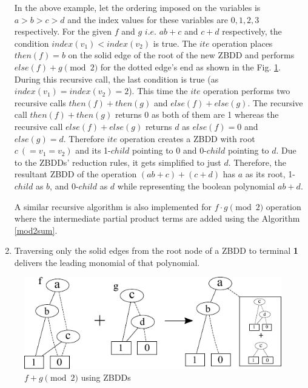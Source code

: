 \documentclass{article}
\begin{document}
\begin{enumerate}
	\par In the above example, let the ordering imposed on the variables is $a>b>c>d$ and the 
	index values for these variables are $0,1,2,3$ respectively. For the given $f$ and $g$ $i.e.$
	$ab+c$ and $c + d$ respectively, the condition $index(v_1) < index(v_2)$ is true. The $ite$ operation places
	$then(f) = b$ on the solid edge of the root of the new ZBDD and performs $else(f) + g \pmod2$ for the 
	dotted edge's end as shown in the Fig. \ref{mod2sumfig}. During this recursive call, the last condition is true 
	(as $index(v_1) = index(v_2) = 2$). This time the  $ite$ operation performs two recursive calls $then(f) + then(g)$ and 
	$else(f) + else(g)$. The recursive call $then(f) + then(g)$ returns 0 as 
	both of them are 1 whereas the recursive call $else(f) + else(g)$ returns $d$ as $else(f) = 0$
	and $else(g) = d$. Therefore $ite$ operation creates a ZBDD with root $c~(= v_1 = v_2)$ and its 1-$child$
	pointing to 0 and 0-$child$ pointing to $d$. Due to the ZBDDs' reduction rules, it gets simplified to 
	just $d$. Therefore, the resultant ZBDD of the operation $(ab+c)+(c+d)$ has $a$ as its root,
	1-$child$ as $b$, and 0-$child$ as $d$ while representing the boolean polynomial $ab+d$.
 
	A similar recursive algorithm is also implemented for $f\cdot g \pmod 2$ operation
	where the intermediate partial product terms are added using the Algorithm \ref{mod2sum}.

	\item Traversing only the solid edges from the root node of a ZBDD to
    terminal {\bf 1} delivers the leading monomial of that polynomial.  
  
\end{enumerate} 

\begin{figure}[hbt]
\centering
\includegraphics[scale=1]{mod2sumfig.pdf}
\caption{$f+g\pmod 2$ using ZBDDs}
\label{mod2sumfig}
\end{figure}
\end{document}
